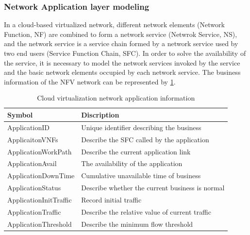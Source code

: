 \documentclass[journal]{IEEEtran}
\begin{document}
    \subsubsection{Network Application layer modeling}
    In a cloud-based virtualized network, different network elements (Network Function, NF) are combined to form a network service (Netwrok Service, NS), and the network service is a service chain formed by a network service used by two end users  (Service Function Chain, SFC). In order to solve the availability of the service, it is necessary to model the network services invoked by the service and the basic network elements occupied by each network service. The business information of the NFV network can be represented by \ref{tab3}.
    \begin{table}[!t]
        \renewcommand{\arraystretch}{1.3}
        \caption{Cloud virtualization network application information}
        \label{tab3}
        \centering
        \begin{tabular}{|l||l|}
            \hline
            Symbol                 & Discription                                     \\
            \hline
            ApplicationID          & Unique identifier describing the business       \\
            ApplicaitonVNFs        & Describe the SFC called by the application      \\
            ApplicationWorkPath    & Describe the current application link           \\
            ApplicationAvail       & The availability of the application             \\
            ApplicationDownTime    & Cumulative unavailable time of business         \\
            ApplicationStatus      & Describe whether the current business is normal \\
            ApplicationInitTraffic & Record initial traffic                          \\
            ApplicationTraffic     & Describe the relative value of current traffic  \\
            ApplicationThreshold   & Describe the minimum flow threshold             \\
            \hline
        \end{tabular}
    \end{table}
\end{document}
